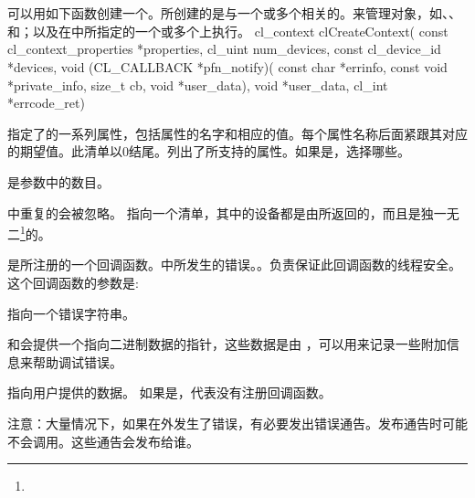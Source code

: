 \startbuffer[sectitlecontext]
\stopbuffer
\section{\getbuffer[sectitlecontext]}
可以用如下函数创建一个\scopencl{}。所创建的\scopencl{}是与一个或多个相关的。\scopencl{}来管理对象，如、、和；以及在中所指定的一个或多个上执行。
\startclc
cl_context clCreateContext(
		const cl_context_properties *properties,
		cl_uint num_devices,
		const cl_device_id *devices,
		void (CL_CALLBACK *pfn_notify)(
			const char *errinfo,
			const void *private_info,
			size_t cb,
			void *user_data),
		void *user_data,
		cl_int *errcode_ret)
\stopclc

指定了的一系列属性，包括属性的名字和相应的值。每个属性名称后面紧跟其对应的期望值。此清单以0结尾。列出了所支持的属性。如果是，选择哪些。

\cltable
{}
{}

是参数中的数目。

\startbuffer[buffnunique]
中重复的会被忽略。
\stopbuffer
{}指向一个清单，其中的设备都是由所返回的，而且是独一无二{\footnote{\getbuffer[buffnunique]}}的。

是所注册的一个回调函数。中所发生的错误。。负责保证此回调函数的线程安全。这个回调函数的参数是:
\startigBase
\item {}指向一个错误字符串。
\item {}和会提供一个指向二进制数据的指针，这些数据是由 ，可以用来记录一些附加信息来帮助调试错误。
\item {}指向用户提供的数据。
\stopigBase
如果是，代表没有注册回调函数。

注意：大量情况下，如果在外发生了错误，有必要发出错误通告。发布通告时可能不会调用。这些通告会发布给谁。

